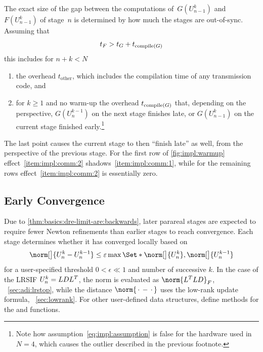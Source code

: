 The exact size of the gap between the computations of~$G(U_{n-1}^k)$ and~$F(U_{n-1}^k)$ of stage~$n$ is determined by
how much the stages are out-of-sync.
Assuming that
\begin{equation}
\label{eq:impl:assumption}
  t_F > t_G + t_{\operatorname{compile}(G)}
\end{equation}
this includes for $n+k < N$
\begin{enumerate}
  \item\label{item:impl:comm:1}
    the overhead $t_\text{other}$,
    which includes \eg the compilation time of any transmission code,
    and
  \item\label{item:impl:comm:2}
    for $k\geq 1$ and no warm-up
    the overhead $t_{\operatorname{compile}(G)}$ that,
    depending on the perspective,
    $G(U_n^{k-1})$ on the next stage finishes late,
    or $G(U_{n-1}^k)$ on the current stage finished early.\footnote{%
      Note how assumption~\eqref{eq:impl:assumption} is false for the hardware used in $N=4$,
      which causes the outlier described in the previous footnote.
    }
\end{enumerate}
The last point causes the current stage to then \enquote{finish late} as well,
from the perspective of the previous stage.
For the first row of \autoref{fig:impl:warmup} effect~\ref{item:impl:comm:2} shadows~\ref{item:impl:comm:1},
while for the remaining rows effect~\ref{item:impl:comm:2} is essentially zero.

\subsection{Early Convergence}
\label{sec:impl:pr:conv}

Due to \autoref{thm:basics:dre-limit-are:backwards},
later parareal stages are expected to require fewer Newton refinements than earlier stages to reach convergence.
Each stage determines whether it has converged locally based on
\begin{equation}
\label{eq:impl:pr:conv}
  \norm[\big]{U_n^k - U_n^{k-1}} \leq \epsilon \max\Set*{ \norm[\big]{U_n^k}, \norm[\big]{U_n^{k-1}} }
\end{equation}
for a user-specified threshold $0 < \epsilon \ll 1$
and number of successive $k$.
In the case of the \ac{LRSIF} $U_n^k = LDL^T$,
the norm is evaluated as $\norm{L^\T L D}_F$,
\cf~\autoref{sec:adi:lrstop},
while the distance $\norm{\optional{} - \optional{}}$ uses the low-rank update formula,
\cf~\autoref{sec:lowrank}.
For other user-defined data structures,
define methods for the  and  functions.

